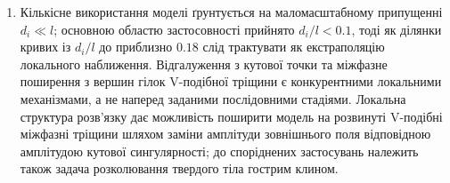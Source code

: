 \begin{enumerate}
\item
Кількісне використання моделі ґрунтується на маломасштабному
припущенні $d_i\ll l$; основною областю застосовності прийнято
$d_i/l<0.1$, тоді як ділянки кривих із $d_i/l$ до приблизно $0.18$
слід трактувати як екстраполяцію локального наближення. Відгалуження з
кутової точки та міжфазне поширення з вершин гілок V-подібної
тріщини є конкурентними локальними механізмами, а не наперед заданими
послідовними стадіями. Локальна структура розв'язку дає можливість
поширити модель на розвинуті V-подібні міжфазні тріщини шляхом заміни
амплітуди зовнішнього поля відповідною амплітудою кутової
сингулярності; до споріднених застосувань належить також задача
розколювання твердого тіла гострим клином.
\end{enumerate}
